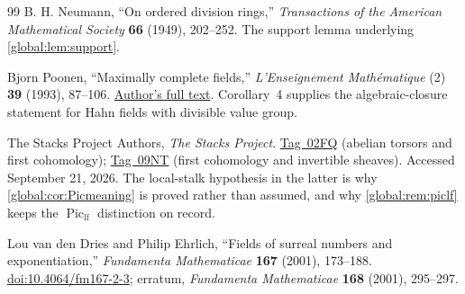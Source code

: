 \documentclass[11pt,letterpaper]{article}
\theoremstyle{definition}
\theoremstyle{remark}
\newcommand{\Piclf}{\operatorname{Pic}_{\mathrm{lf}}}
\numberwithin{equation}{section}
\begin{document}
\begin{thebibliography}{99}
B. H. Neumann, ``On ordered division rings,''
\emph{Transactions of the American Mathematical Society} \textbf{66} (1949), 202--252.
The support lemma underlying \cref{global:lem:support}.

Bjorn Poonen, ``Maximally complete fields,''
\emph{L'Enseignement Math\'ematique} (2) \textbf{39} (1993), 87--106.
\href{https://math.mit.edu/~poonen/papers/amsval.pdf}{Author's full text}.
Corollary~4 supplies the algebraic-closure statement for Hahn fields with divisible value group.

The Stacks Project Authors, \emph{The Stacks Project}.
\href{https://stacks.math.columbia.edu/tag/02FQ}{Tag~02FQ} (abelian torsors and first cohomology);
\href{https://stacks.math.columbia.edu/tag/09NT}{Tag~09NT} (first cohomology and invertible sheaves).
Accessed September 21, 2026. The local-stalk hypothesis in the latter is why \cref{global:cor:Picmeaning} is proved rather than assumed, and why \cref{global:rem:piclf} keeps the $\Piclf$ distinction on record.

Lou van den Dries and Philip Ehrlich,
``Fields of surreal numbers and exponentiation,''
\emph{Fundamenta Mathematicae} \textbf{167} (2001), 173--188.
\href{https://doi.org/10.4064/fm167-2-3}{doi:10.4064/fm167-2-3};
erratum, \emph{Fundamenta Mathematicae} \textbf{168} (2001), 295--297.

\end{thebibliography}
\end{document}
